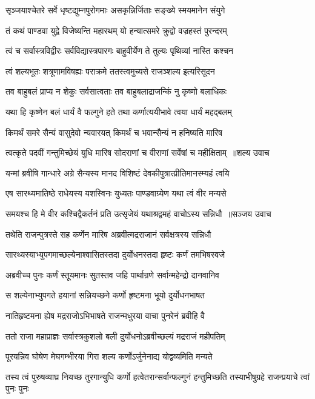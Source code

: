\twolineshloka
{सृञ्जयाश्चेतरे सर्वे धृष्टद्युम्नपुरोगमाः}
{असकृन्निर्जिताः सङ्ख्ये स्मयमानेन संयुगे}


\twolineshloka
{तं कथं पाण्डवा युद्वे विजेष्यन्ति महारथम्}
{यो हन्यात्समरे क्रुद्वो वज्रहस्तं पुरन्दरम्}


\twolineshloka
{त्वं च सर्वास्त्रविद्वीरः सर्वविद्यास्त्रपारगः}
{बाहुवीर्येण ते तुल्यः पृथिव्यां नास्ति कश्चन}


\twolineshloka
{त्वं शल्यभूतः शत्रूणामविषह्यः पराक्रमे}
{ततस्त्वमुच्यसे राजञ्शल्य इत्यरिसूदन}


\twolineshloka
{तव बाहुबलं प्राप्य न शेकुः सर्वसात्वताः}
{तव बाहुबलाद्राजन्किं नु कृष्णो बलाधिकः}


\twolineshloka
{यथा हि कृष्णेन बलं धार्यं वै फल्गुने हते}
{तथा कर्णात्ययीभावे त्वया धार्यं महद्बलम्}


\twolineshloka
{किमर्थं समरे सैन्यं वासुदेवो न्यवारयत्}
{किमर्थं च भवान्सैन्यं न हनिष्यति मारिष}


\threelineshloka
{त्वत्कृते पदवीं गन्तुमिच्छेयं युधि मारिष}
{सोदराणां च वीराणां सर्वेषां च महीक्षिताम् ॥शल्य उवाच}
{}


\twolineshloka
{यन्मां ब्रवीषि गान्धारे अग्रे सैन्यस्य मानद}
{विशिष्टं देवकीपुत्रात्प्रीतिमानस्म्यहं त्वयि}


\twolineshloka
{एष सारथ्यमातिष्ठे राधेयस्य यशस्विनः}
{युध्यतः पाण्डवाग्र्येण यथा त्वं वीर मन्यसे}


\threelineshloka
{समयश्च हि मे वीर कश्चिद्वैकर्तनं प्रति}
{उत्सृजेयं यथाश्रद्वमहं वाचोऽस्य सन्निधौ ॥सञ्जय उवाच}
{}


\twolineshloka
{तथेति राजन्पुत्रस्ते सह कर्णेन मारिष}
{अब्रवीत्मद्रराजानं सर्वक्षत्रस्य सन्निधौ}


\twolineshloka
{सारथ्यस्याभ्युपगमाच्छल्येनाश्वासितस्तदा}
{दुर्योधनस्तदा हृष्टः कर्णं तमभिषस्वजे}


\twolineshloka
{अब्रवीच्च पुनः कर्णं स्तूयमानः सुतस्तव}
{जहि पार्थान्रणे सर्वान्महेन्द्रो दानवानिव}


\twolineshloka
{स शल्येनाभ्युपगते हयानां सन्नियच्छने}
{कर्णो हृष्टमना भूयो दुर्योधनभाषत}


\twolineshloka
{नातिहृष्टमना ह्येष मद्रराजोऽभिभाषते}
{राजन्मधुरया वाचा पुनरेनं ब्रवीहि वै}


\twolineshloka
{ततो राजा महाप्राज्ञः सर्वास्त्रकुशलो बली}
{दुर्योधनोऽब्रवीच्छल्यं मद्रराजं महीपतिम्}


\twolineshloka
{पूरयन्निव घोषेण मेघगम्भीरया गिरा}
{शल्य कर्णोऽर्जुनेनाद्य योद्वव्यमिति मन्यते}


\threelineshloka
{तस्य त्वं पुरुषव्याघ्र नियच्छ तुरगान्युधि}
{कर्णो हत्वेतरान्सर्वान्फल्गुनं हन्तुमिच्छति}
{तस्याभीषुग्रहे राजन्प्रयाचे त्वां पुनः पुनः}


